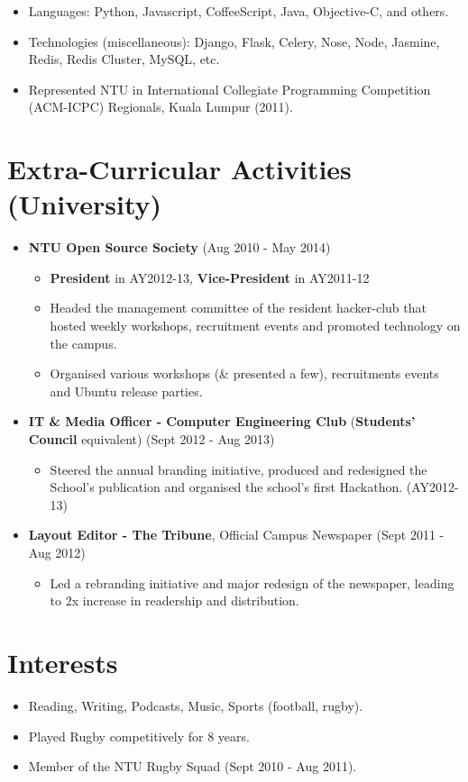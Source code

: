 \begin{itemize}
\tightlist
\item
  Languages: Python, Javascript, CoffeeScript, Java, Objective-C, and
  others.
\item
  Technologies (miscellaneous): Django, Flask, Celery, Nose, Node,
  Jasmine, Redis, Redis Cluster, MySQL, etc.
\item
  Represented NTU in International Collegiate Programming Competition
  (ACM-ICPC) Regionals, Kuala Lumpur (2011).
\end{itemize}

\section{Extra-Curricular Activities
(University)}\label{extra-curricular-activities-university}

\begin{itemize}
\tightlist
\item
  \textbf{NTU Open Source Society} \hfill (Aug 2010 - May 2014)

  \begin{itemize}
  \tightlist
  \item
    \textbf{President} in AY2012-13, \textbf{Vice-President} in
    AY2011-12
  \item
    Headed the management committee of the resident hacker-club that
    hosted weekly workshops, recruitment events and promoted technology
    on the campus.
  \item
    Organised various workshops (\& presented a few), recruitments
    events and Ubuntu release parties.
  \end{itemize}
\item
  \textbf{IT \& Media Officer - Computer Engineering Club}
  (\textbf{Students' Council} equivalent) \hfill (Sept 2012 - Aug 2013)

  \begin{itemize}
  \tightlist
  \item
    Steered the annual branding initiative, produced and redesigned the
    School's publication and organised the school's first Hackathon.
    (AY2012-13)
  \end{itemize}
\item
  \textbf{Layout Editor - The Tribune}, Official Campus Newspaper
  \hfill (Sept 2011 - Aug 2012)

  \begin{itemize}
  \tightlist
  \item
    Led a rebranding initiative and major redesign of the newspaper,
    leading to 2x increase in readership and distribution.
  \end{itemize}
\end{itemize}

\section{Interests}\label{interests}

\begin{itemize}
\tightlist
\item
  Reading, Writing, Podcasts, Music, Sports (football, rugby).
\item
  Played Rugby competitively for 8 years.
\item
  Member of the NTU Rugby Squad (Sept 2010 - Aug 2011).
\end{itemize}
